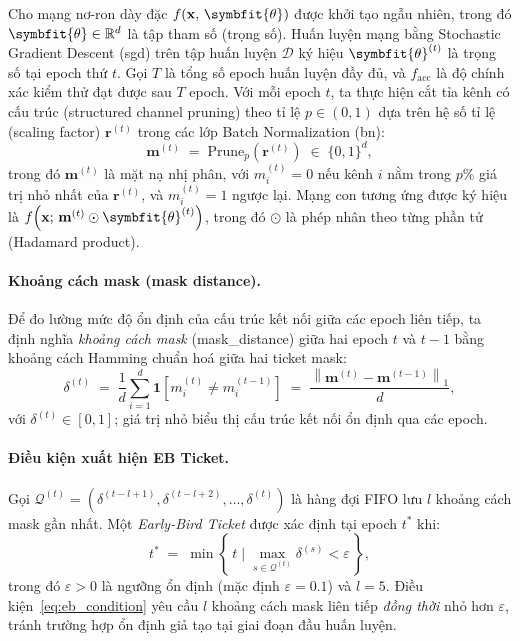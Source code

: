 Cho mạng nơ-ron dày đặc $f(\mathbf{x},\,\symbfit{\theta})$ được khởi tạo ngẫu nhiên, trong đó
$\symbfit{\theta} \in \mathbb{R}^{d}$ là tập tham số (trọng số).
Huấn luyện mạng bằng Stochastic Gradient Descent (\gls{sgd}) trên tập huấn luyện $\mathcal{D}$
ký hiệu $\symbfit{\theta}^{(t)}$ là trọng số tại epoch thứ $t$.
Gọi $T$ là tổng số epoch huấn luyện đầy đủ, và $f_{\mathrm{acc}}$ là độ chính xác kiểm thử
đạt được sau $T$ epoch.
Với mỗi epoch $t$, ta thực hiện cắt tỉa kênh có cấu trúc (structured channel pruning) theo tỉ lệ
$p \in (0,1)$ dựa trên hệ số tỉ lệ (scaling factor) $\mathbf{r}^{(t)}$ trong các lớp Batch
Normalization (\gls{bn}):
\[
    \mathbf{m}^{(t)} \;=\; \mathrm{Prune}_{p}\!\left(\mathbf{r}^{(t)}\right)
    \;\in\; \{0,1\}^{d},
\]
trong đó $\mathbf{m}^{(t)}$ là mặt nạ nhị phân, với $m_i^{(t)} = 0$ nếu kênh $i$
nằm trong $p\%$ giá trị nhỏ nhất của $\mathbf{r}^{(t)}$, và $m_i^{(t)} = 1$ ngược lại.
Mạng con tương ứng được ký hiệu là $f\!\left(\mathbf{x};\,\mathbf{m}^{(t)} \odot \symbfit{\theta}^{(t)}\right)$,
trong đó $\odot$ là phép nhân theo từng phần tử (Hadamard product).

\paragraph{\textbf{Khoảng cách mask} (mask distance).}
Để đo lường mức độ ổn định của cấu trúc kết nối giữa các epoch liên tiếp, ta định nghĩa
\emph{khoảng cách mask} (\gls{mask_distance}) giữa hai epoch $t$ và $t-1$ bằng khoảng cách Hamming
chuẩn hoá giữa hai ticket mask:
\begin{equation}
    \delta^{(t)} \;=\; \frac{1}{d}\sum_{i=1}^{d}
    \mathbf{1}\!\left[m_i^{(t)} \neq m_i^{(t-1)}\right]
    \;=\; \frac{\left\|\mathbf{m}^{(t)} - \mathbf{m}^{(t-1)}\right\|_1}{d},
    \label{eq:mask_distance}
\end{equation}
với $\delta^{(t)} \in [0,1]$; giá trị nhỏ biểu thị cấu trúc kết nối ổn định qua các epoch.

\paragraph{\textbf{Điều kiện xuất hiện EB Ticket.}}
Gọi $\mathcal{Q}^{(t)} = \left(\delta^{(t-l+1)}, \delta^{(t-l+2)}, \ldots, \delta^{(t)}\right)$
là hàng đợi FIFO lưu $l$ khoảng cách mask gần nhất.
Một \emph{Early-Bird Ticket} được xác định tại epoch $t^*$ khi:
\begin{equation}
    t^* \;=\; \min\left\{\, t \;\Big|\;
    \max_{s \in \mathcal{Q}^{(t)}} \delta^{(s)} < \varepsilon \,\right\},
    \label{eq:eb_condition}
\end{equation}
trong đó $\varepsilon > 0$ là ngưỡng ổn định (mặc định $\varepsilon = 0.1$) và $l = 5$.
Điều kiện~\eqref{eq:eb_condition} yêu cầu $l$ khoảng cách mask liên tiếp \emph{đồng thời}
nhỏ hơn $\varepsilon$, tránh trường hợp ổn định giả tạo tại giai đoạn đầu huấn luyện.

